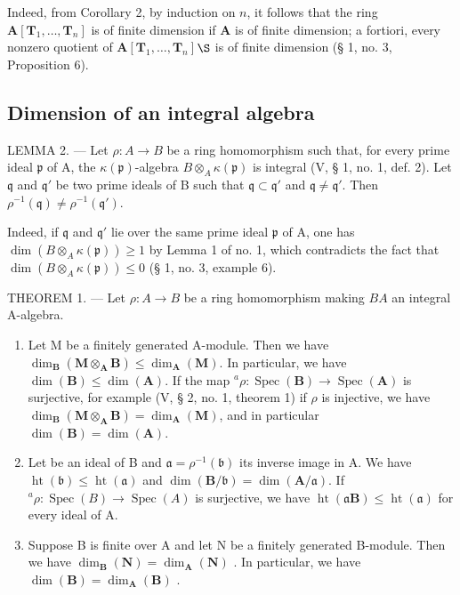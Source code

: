 Indeed, from Corollary 2, by induction on \(n\), it follows that the ring \(\mathbf{A}[\mathbf{T}_{1}, \ldots, \mathbf{T}_{n}]\) is of finite dimension if \(\mathbf{A}\) is of finite dimension; a fortiori, every nonzero quotient of \(\mathbf{A}[\mathbf{T}_{1}, \ldots, \mathbf{T}_{n}]\)\(\S\) is of finite dimension (§ 1, no. 3, Proposition 6).

\subsection{Dimension of an integral algebra}

LEMMA 2. --- Let \(\rho: A \to B\) be a ring homomorphism such that, for every prime ideal \(\mathfrak{p}\) of A, the \(\kappa(\mathfrak{p})\)-algebra \(B \otimes_{A} \kappa(\mathfrak{p})\) is integral (V, § 1, no. 1, def. 2). Let \(\mathfrak{q}\) and \(\mathfrak{q}'\) be two prime ideals of B such that \(\mathfrak{q} \subset \mathfrak{q}'\) and \(\mathfrak{q} \neq \mathfrak{q}'\). Then \(\rho^{-1}(\mathfrak{q}) \neq \rho^{-1}(\mathfrak{q}')\).

Indeed, if \(\mathfrak{q}\) and \(\mathfrak{q}'\) lie over the same prime ideal \(\mathfrak{p}\) of A, one has \(\dim(B \otimes_{A} \kappa(\mathfrak{p})) \geqslant 1\) by Lemma 1 of no. 1, which contradicts the fact that \(\dim(B \otimes_{A} \kappa(\mathfrak{p})) \leqslant 0\) (§ 1, no. 3, example 6).

THEOREM 1. --- Let \(\rho: A \to B\) be a ring homomorphism making \(B\)\(A\) an integral A-algebra.

\begin{enumerate}
\def\labelenumi{\alph{enumi})}
\item
  Let M be a finitely generated A-module. Then we have \(\dim_{\mathbf{B}}(\mathbf{M} \otimes_{\mathbf{A}} \mathbf{B}) \leqslant \dim_{\mathbf{A}}(\mathbf{M})\). In particular, we have \(\dim(\mathbf{B}) \leqslant \dim(\mathbf{A})\). If the map \({}^{a}\rho: \operatorname{Spec}(\mathbf{B}) \to \operatorname{Spec}(\mathbf{A})\) is surjective, for example (V, § 2, no. 1, theorem 1) if \(\rho\) is injective, we have \(\dim_{\mathbf{B}}(\mathbf{M} \otimes_{\mathbf{A}} \mathbf{B}) = \dim_{\mathbf{A}}(\mathbf{M})\), and in particular \(\dim(\mathbf{B}) = \dim(\mathbf{A})\).
\item
  Let  be an ideal of B and \(\mathfrak{a} = \rho^{-1}(\mathfrak{b})\) its inverse image in A. We have \(\operatorname{ht}(\mathfrak{b}) \leqslant \operatorname{ht}(\mathfrak{a})\) and \(\dim(\mathbf{B}/\mathfrak{b}) = \dim(\mathbf{A}/\mathfrak{a})\). If \({}^{a}\rho : \operatorname{Spec}(B) \to \operatorname{Spec}(A)\) is surjective, we have \(\operatorname{ht}(\mathfrak{a}\mathbf{B}) \leqslant \operatorname{ht}(\mathfrak{a})\) for every ideal  of A.
\item
  Suppose B is finite over A and let N be a finitely generated B-module. Then we have \(\dim_{\mathbf{B}}(\mathbf{N}) = \dim_{\mathbf{A}}(\mathbf{N})\) . In particular, we have \(\dim(\mathbf{B}) = \dim_{\mathbf{A}}(\mathbf{B})\) .
\end{enumerate}

